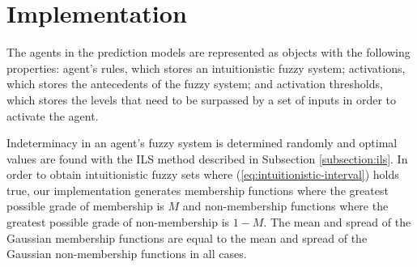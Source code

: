 ﻿\documentclass{ieeeaccess}
\begin{document}
\section{Implementation}
\label{section:implementation}

The agents in the prediction models are represented as objects with
the following properties: agent's rules, which stores an
intuitionistic fuzzy system; activations, which stores the antecedents
of the fuzzy system; and activation thresholds, which stores the
levels that need to be surpassed by a set of inputs in order to
activate the agent.

Indeterminacy in an agent's fuzzy system is determined randomly and
optimal values are found with the ILS method described in
Subsection \ref{subsection:ils}. In order to obtain
intuitionistic fuzzy sets where (\ref{eq:intuitionistic-interval}) holds
true, our implementation generates membership functions where the
greatest possible grade of membership is $M$ and non-membership
functions where the greatest possible grade of non-membership is $1 -
M$. The mean and spread of the Gaussian membership functions are
equal to the mean and spread of the Gaussian non-membership functions
in all cases.
\end{document}
